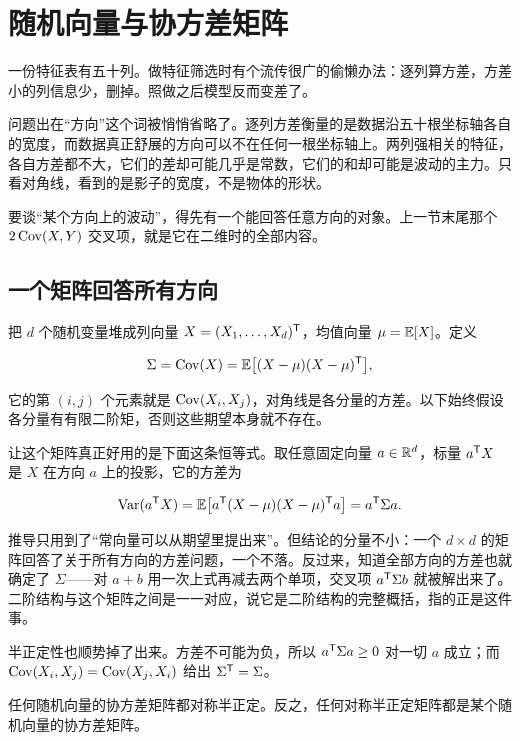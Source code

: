 \section{随机向量与协方差矩阵}
\label{sec:05-Probability/05-Joint-Distributions/04}

一份特征表有五十列。做特征筛选时有个流传很广的偷懒办法：逐列算方差，方差小的列信息少，删掉。照做之后模型反而变差了。

问题出在``方向''这个词被悄悄省略了。逐列方差衡量的是数据沿五十根坐标轴各自的宽度，而数据真正舒展的方向可以不在任何一根坐标轴上。两列强相关的特征，各自方差都不大，它们的差却可能几乎是常数，它们的和却可能是波动的主力。只看对角线，看到的是影子的宽度，不是物体的形状。

要谈``某个方向上的波动''，得先有一个能回答任意方向的对象。上一节末尾那个 \(2\operatorname{Cov}(X,Y)\) 交叉项，就是它在二维时的全部内容。

\subsection{一个矩阵回答所有方向}

把 \(d\) 个随机变量堆成列向量 \(X=(X_1,\ldots,X_d)^{\mathsf{T}}\)，均值向量 \(\mu=\mathbb{E}[X]\)。定义

\[
\Sigma=\operatorname{Cov}(X)=\mathbb{E}\bigl[(X-\mu)(X-\mu)^{\mathsf{T}}\bigr],
\]

它的第 \((i,j)\) 个元素就是 \(\operatorname{Cov}(X_i,X_j)\)，对角线是各分量的方差。以下始终假设各分量有有限二阶矩，否则这些期望本身就不存在。

让这个矩阵真正好用的是下面这条恒等式。取任意固定向量 \(a\in\mathbb{R}^d\)，标量 \(a^{\mathsf{T}}X\) 是 \(X\) 在方向 \(a\) 上的投影，它的方差为

\[
\operatorname{Var}(a^{\mathsf{T}}X)
=\mathbb{E}\bigl[a^{\mathsf{T}}(X-\mu)(X-\mu)^{\mathsf{T}}a\bigr]
=a^{\mathsf{T}}\Sigma a.
\]

推导只用到了``常向量可以从期望里提出来''。但结论的分量不小：一个 \(d\times d\) 的矩阵回答了关于所有方向的方差问题，一个不落。反过来，知道全部方向的方差也就确定了 \(\Sigma\)——对 \(a+b\) 用一次上式再减去两个单项，交叉项 \(a^{\mathsf{T}}\Sigma b\) 就被解出来了。二阶结构与这个矩阵之间是一一对应，说它是二阶结构的完整概括，指的正是这件事。

半正定性也顺势掉了出来。方差不可能为负，所以 \(a^{\mathsf{T}}\Sigma a\ge 0\) 对一切 \(a\) 成立；而 \(\operatorname{Cov}(X_i,X_j)=\operatorname{Cov}(X_j,X_i)\) 给出 \(\Sigma^{\mathsf{T}}=\Sigma\)。

\begin{proposition}
任何随机向量的协方差矩阵都对称半正定。反之，任何对称半正定矩阵都是某个随机向量的协方差矩阵。
\end{proposition}

